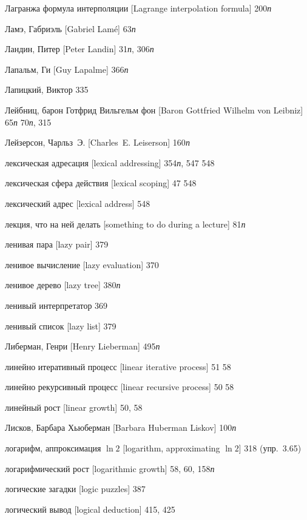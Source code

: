 \begin{theindex}
\bigskip
\item {Лагранжа формула интерполяции [Lagrange interpolation formula]} 200{\it п}
\item {Ламэ, Габриэль [Gabriel Lam\'e]} 63{\it п}
\item {Ландин, Питер [Peter Landin]} 31{\it п}, 306{\it п}
\item {Лапальм, Ги [Guy Lapalme]} 366{\it п}
\item {Лапицкий, Виктор} 335
\item {Лейбниц, барон Готфрид Вильгельм фон [Baron Gottfried Wilhelm von Leibniz]}
   65{\it п}
   70{\it п}, 315
\item {Лейзерсон, Чарльз~Э. [Charles~E. Leiserson]} 160{\it п}
\item {лексическая адресация [lexical addressing]} 354{\it п}, 547
   548
\item {лексическая сфера действия [lexical scoping]} 47
   548
\item {лексический адрес [lexical address]} 548
\item {лекция, что на ней делать [something to do during a lecture]} 81{\it п}
\item {ленивая пара [lazy pair]} 379
\item {ленивое вычисление [lazy evaluation]} 370
\item {ленивое дерево [lazy tree]} 380{\it п}
\item {ленивый интерпретатор} 369
\item {ленивый список [lazy list]} 379
\item {Либерман, Генри [Henry Lieberman]} 495{\it п}
\item {линейно итеративный процесс [linear iterative process]} 51
   58
\item {линейно рекурсивный процесс [linear recursive process]} 50
   58
\item {линейный рост [linear growth]} 50, 58
\item {Лисков, Барбара Хьюберман [Barbara Huberman Liskov]} 100{\it п}
\item {логарифм, аппроксимация $\ln 2$ [logarithm, approximating $\ln 2$]} 318 (упр.~3.65)
\item {логарифмический рост [logarithmic growth]} 58, 60, 158{\it п}
\item {логические загадки [logic puzzles]} 387
\item {логический вывод [logical deduction]} 415, 425

\end{theindex}
